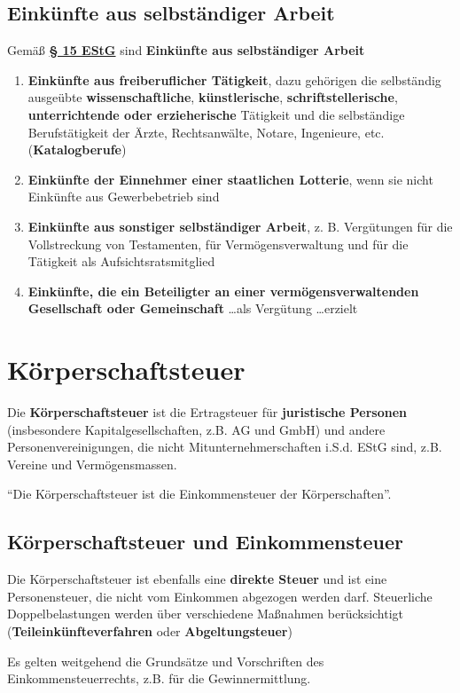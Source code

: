 \documentclass[12pt,A4]{extarticle}
\newcommand{\highlight}[1]{\textcolor{highlightColor}{\textbf{#1}}}
\newcommand{\estG}[2][]{\textbf{\textcolor{gesetzLink}{\href{https://www.gesetze-im-internet.de/estg/__#2.html}{§ #2 \ifthenelse{\equal{#1}{}}{}{#1 }EStG}}}}
\begin{document}
\subsection{Einkünfte aus selbständiger Arbeit}
Gemäß \estG[Abs. 1]{15} sind \highlight{Einkünfte aus selbständiger Arbeit}
\begin{enumerate}
  \item{\textbf{Einkünfte aus freiberuflicher Tätigkeit}, dazu gehörigen die selbständig ausgeübte \textbf{wissenschaftliche}, \textbf{künstlerische}, \textbf{schriftstellerische}, \textbf{unterrichtende oder erzieherische} Tätigkeit und die selbständige Berufstätigkeit der Ärzte, Rechtsanwälte, Notare, Ingenieure, etc. (\highlight{Katalogberufe})}
  \item{\textbf{Einkünfte der Einnehmer einer staatlichen Lotterie}, wenn sie nicht Einkünfte aus Gewerbebetrieb sind}
  \item{\textbf{Einkünfte aus sonstiger selbständiger Arbeit}, z. B. Vergütungen für die Vollstreckung von Testamenten, für Vermögensverwaltung und für die Tätigkeit als Aufsichtsratsmitglied}
  \item{\textbf{Einkünfte, die ein Beteiligter an einer vermögensverwaltenden Gesellschaft oder Gemeinschaft} \dots als Vergütung \dots erzielt}
\end{enumerate}

\section{Körperschaftsteuer}
Die \highlight{Körperschaftsteuer} ist die Ertragsteuer für \textbf{juristische Personen} (insbesondere Kapitalgesellschaften, z.B. AG und GmbH) und andere Personenvereinigungen, die nicht Mitunternehmerschaften i.S.d. EStG sind, z.B. Vereine und Vermögensmassen.\par
``Die Körperschaftsteuer ist die Einkommensteuer der Körperschaften''.

\subsection{Körperschaftsteuer und Einkommensteuer}
Die Körperschaftsteuer ist ebenfalls eine \textbf{direkte Steuer} und ist eine Personensteuer, die nicht vom Einkommen abgezogen werden darf. Steuerliche Doppelbelastungen werden über verschiedene Maßnahmen berücksichtigt (\textbf{Teileinkünfteverfahren} oder \textbf{Abgeltungsteuer}) \par
Es gelten weitgehend die Grundsätze und Vorschriften des Einkommensteuerrechts, z.B. für die Gewinnermittlung.
\end{document}
